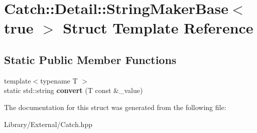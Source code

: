 \hypertarget{struct_catch_1_1_detail_1_1_string_maker_base_3_01true_01_4}{}\section{Catch\+:\+:Detail\+:\+:String\+Maker\+Base$<$ true $>$ Struct Template Reference}
\label{struct_catch_1_1_detail_1_1_string_maker_base_3_01true_01_4}
\subsection*{Static Public Member Functions}
\begin{DoxyCompactItemize}
\item 
\hypertarget{struct_catch_1_1_detail_1_1_string_maker_base_3_01true_01_4_af9b5fdf7fddd8c5c873caa819e5f00f6}{}{\footnotesize template$<$typename T $>$ }\\static std\+::string {\bfseries convert} (T const \&\+\_\+value)\label{struct_catch_1_1_detail_1_1_string_maker_base_3_01true_01_4_af9b5fdf7fddd8c5c873caa819e5f00f6}

\end{DoxyCompactItemize}


The documentation for this struct was generated from the following file\+:\begin{DoxyCompactItemize}
\item 
Library/\+External/Catch.\+hpp\end{DoxyCompactItemize}
